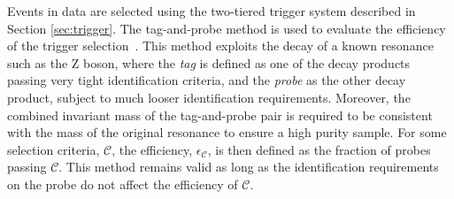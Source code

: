 

Events in data are selected using the two-tiered trigger system described in Section \ref{sec:trigger}. The tag-and-probe method is used to evaluate the efficiency of the trigger selection~\cite{CMS:2011aa}. This method exploits the decay of a known resonance such as the Z boson, where the \textit{tag} is defined as one of the decay products passing very tight identification criteria, and the \textit{probe} as the other decay product, subject to much looser identification requirements. Moreover, the combined invariant mass of the tag-and-probe pair is required to be consistent with the mass of the original resonance to ensure a high purity sample. For some selection criteria, $\mathcal{C}$, the efficiency, $\epsilon_{\mathcal{C}}$, is then defined as the fraction of probes passing $\mathcal{C}$. This method remains valid as long as the identification requirements on the probe do not affect the efficiency of $\mathcal{C}$.

